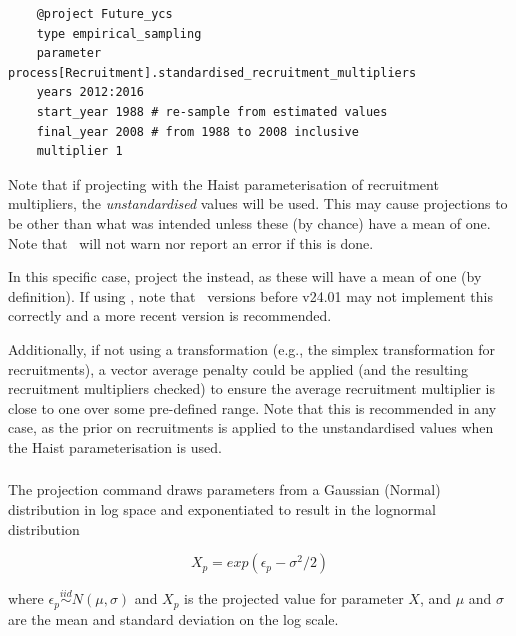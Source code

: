 {\small{\begin{verbatim}
	@project Future_ycs
	type empirical_sampling
	parameter process[Recruitment].standardised_recruitment_multipliers
	years 2012:2016
	start_year 1988 # re-sample from estimated values
	final_year 2008 # from 1988 to 2008 inclusive
	multiplier 1
\end{verbatim}}}

Note that if projecting  with the Haist parameterisation of recruitment multipliers, the \emph{unstandardised} values will be used. This may cause projections to be other than what was intended unless these (by chance) have a mean of one. Note that \CNAME\ will not warn nor report an error if this is done. 

In this specific case, project the  instead, as these will have a mean of one (by definition). If using , note that \CNAME\ versions before v24.01 may not implement this correctly and a more recent version is recommended. 

Additionally, if not using a transformation (e.g., the simplex transformation for recruitments), a vector average penalty could be applied (and the resulting recruitment multipliers checked) to ensure the average recruitment multiplier is close to one over some pre-defined range. Note that this is recommended in any case, as the prior on recruitments is applied to the unstandardised values when the Haist parameterisation is used. 

\subsubsection{}
\label{sec:Project-LogNormal}

The  projection command draws parameters from a Gaussian (Normal) distribution in log space and exponentiated to result in the lognormal distribution

\begin{equation}\label{eq:lognormal}
X_p = exp(\epsilon_p - \sigma^2 / 2)
\end{equation}

where $\epsilon_p\stackrel{iid}{\sim}N(\mu,\sigma)$ and $X_p$ is the projected value for parameter $X$, and $\mu$ and $\sigma$ are the mean and standard deviation on the log scale.

